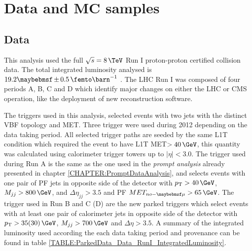 \section{Data and MC samples}


\subsection{Data}


This analysis used the full  $\sqrt{s}=8\,\TeV$ Run I proton-proton certified collision data. The total integrated luminosity analysed is $19.2 \pm 0.5 \,\femto\barn^{-1}$ \cite{ARTICLE:CMSLuminosityBasedonPixelClusterCounting}. The \gls{LHC} Run I was composed of four periods A, B, C and D which identify major changes on either the \gls{LHC} or \gls{CMS} operation, like the deployment of new reconstruction software.

The triggers used in this analysis, selected events with two jets with the distinct \gls{VBF} topology and \gls{MET}. Three trigger were used during 2012 depending on the data taking period. All selected trigger paths are seeded by the same \gls{L1T} condition which required the event to have \gls{L1T} \gls{MET}$>40\,\GeV$, this quantity was calculated using calorimeter trigger towers up to $|\eta|<3.0$. The trigger used during Run A is the same as the one used in the \textit{prompt analysis} already presented in chapter \ref{CHAPTER:PromptDataAnalysis}, and selects events with one pair of \gls{PF} jets in opposite side of the detector with $\pt>40\,\GeV$, $M_{jj}>800\,\GeV$, and $\Delta\eta_{jj}>3.5$ and \gls{PF} $MET_{no-\mu}>65\,\GeV$. The trigger used in Run B and C (D) are the new parked triggers which select events with at least one pair of calorimeter jets in opposite side of the detector with $\pt>35(30)\,\GeV$, $M_{jj}>700\,\GeV$ and $\Delta\eta>3.5$. A summary of the integrated luminosity used according the each data taking period and provenance can be found in table \ref{TABLE:ParkedData_Data_RunI_IntegratedLuminosity}.

